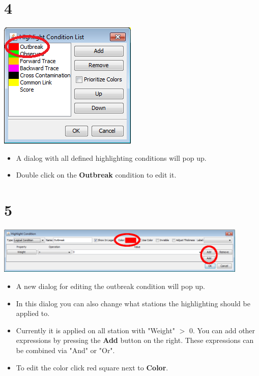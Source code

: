 \documentclass{beamer}
\begin{document}
\section{4}
\begin{frame}
	\begin{center}
  		\includegraphics[height=0.6\textheight]{4.png}
	\end{center}
	\begin{itemize}
		\item A dialog with all defined highlighting conditions will pop up.
		\item Double click on the \textbf{Outbreak} condition to edit it.
	\end{itemize}
\end{frame}

\section{5}
\begin{frame}
	\begin{center}
  		\includegraphics[width=0.9\textwidth]{5.png}
	\end{center}
	\begin{itemize}
		\item A new dialog for editing the outbreak condition will pop up.
		\item In this dialog you can also change what stations the highlighting should be applied to.
		\item Currently it is applied on all station with "Weight" $>$ 0. You can add other expressions by pressing the \textbf{Add} button on the right. These expressions can be combined via "And" or "Or".
		\item To edit the color click red square next to \textbf{Color}.
	\end{itemize}
\end{frame}
\end{document}
